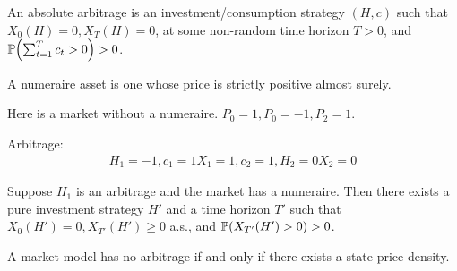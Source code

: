 \begin{thm}
  \label{defn:discrete_time_models:10}
  An absolute arbitrage is an investment/consumption strategy $(H, c)$
  such that $X_{0}(H) = 0, X_T(H) = 0$, at some non-random time horizon
  $T > 0$, and $\Prob{\sum_{t=1}^T c_t > 0} > 0$.
\end{thm}

\begin{defn}
  \label{defn:discrete_time_models:11}
  A numeraire asset is one whose price is strictly positive almost surely.
\end{defn}

\begin{exmp}
  \label{defn:discrete_time_models:12}
  Here is a market without a numeraire. $P_{0} = 1, P_{0} = -1, P_{2}
  = 1$.

  Arbitrage:
  \begin{align*}
    H_{1} = -1, c_{1} = 1
    X_{1}= 1, c_{2} = 1, H_{2} = 0
    X_{2}= 0
  \end{align*}
\end{exmp}

\begin{exer}
  Suppose $H_{1}$ is an arbitrage and the market has a numeraire.
  Then there exists a pure investment strategy $H'$ and a time horizon $T'$ such that
  $X_{0}(H') = 0, X_{T'}(H') \geq 0$ a.s., and $\Prob{X_{T'}(H') > 0}
    > 0$.
\end{exer}

\begin{thm}
  \label{defn:discrete_time_models:13}
  A market model has no arbitrage if and only if there exists a state
  price density.
\end{thm}

